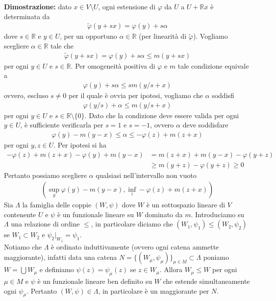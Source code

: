 \documentclass{article}
\numberwithin{equation}{subsection}
\begin{document}
\textbf{Dimostrazione:} dato $x \in V \setminus U$, ogni estensione di $\varphi$ da $U$ a $U + \mathbb{R}x$ è determinata da
\begin{align*}
    \widetilde{\varphi}(y + sx) = \varphi(y) + s\alpha
\end{align*}
dove $s \in \mathbb{R}$ e $y \in U$, per un opportuno $\alpha \in \mathbb{R}$ (per linearità di $\widetilde{\varphi}$). Vogliamo scegliere $\alpha \in \mathbb{R}$ tale che
\begin{align*}
    \widetilde{\varphi}(y + sx) = \varphi(y) + s\alpha \leq m(y + sx)
\end{align*}
per ogni $y \in U$ e $s \in \mathbb{R}$. Per omogeneità positiva di $\varphi$ e $m$ tale condizione equivale a
\begin{align*}
    \varphi(y) + s\alpha \leq sm(y/s + x)
\end{align*}
ovvero, escluso $s \neq 0$ per il quale è ovvia per ipotesi, vogliamo che $\alpha$ soddisfi 
\begin{align*}
    \varphi(y/s) + \alpha \leq m(y/s + x)
\end{align*}
per ogni $y \in U$ e $s \in \mathbb{R} \setminus \{0\}$. Dato che la condizione deve essere valida per ogni $y \in U$, è sufficiente verificarla per $s = 1$ e $s = -1$, ovvero $\alpha$ deve soddisfare
\begin{align*}
    \varphi(y) - m(y - x) \leq \alpha \leq -\varphi(z) +m(z + x)
\end{align*}
per ogni $y, z \in U$. Per ipotesi si ha
\begin{align*}
    - \varphi(z) + m(z + x) - \varphi(y) + m(y - x) &= m(z + x) + m(y - x) - \varphi(y + z) \\
    &\geq m(y + z) - \varphi(y + z) \geq 0
\end{align*}
Pertanto possiamo scegliere $\alpha$ qualsiasi nell'intervallo non vuoto
\begin{align*}
    \left(\sup_y \varphi(y) - m(y - x), \inf_z -\varphi(z) + m(z + x)\right)
\end{align*}
Sia $\Lambda$ la famiglia delle coppie $(W, \psi)$ dove $W$ è un sottospazio lineare di $V$ contenente $U$ e $\psi$ è un funzionale lineare su $W$ dominato da $m$. Introduciamo su $\Lambda$ una relazione di ordine $\leq$, in particolare diciamo che $(W_1, \psi_1) \leq (W_2, \psi_2)$ se $W_1 \subset W_2$ e $\psi_2|_{W_1} = \psi_1$. \\
Notiamo che $\Lambda$ è ordinato induttivamente (ovvero ogni catena ammette maggiorante), infatti data una catena $N = \{(W_\mu, \psi_\mu)\}_{\mu \in M} \subset \Lambda$ poniamo $W = \bigcup W_\mu$ e definiamo $\psi(z) = \psi_\mu(z)$ se $z \in W_\mu$. Allora $W_\mu \leq W$ per ogni $\mu \in M$ e $\psi$ è un funzionale lineare ben definito su $W$ che estende simultaneamente ogni $\psi_\mu$. Pertanto $(W, \psi) \in \Lambda$, in particolare è un maggiorante per $N$. \\
\end{document}
